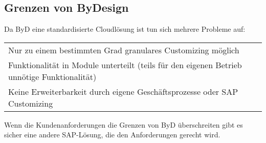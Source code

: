 \documentclass{handout}
\begin{document}
\subsection{Grenzen von ByDesign}

Da ByD eine standardisierte Cloudlösung ist tun sich mehrere Probleme auf:

\small
\begin{tabular}{L l}
Nur zu einem bestimmten Grad granulares Customizing möglich\\
Funktionalität in Module unterteilt (teils für den eigenen Betrieb unnötige Funktionalität)\\
Keine Erweiterbarkeit durch eigene Geschäftsprozesse oder SAP Customizing\\
\end{tabular}
\normalsize

Wenn die Kundenanforderungen die Grenzen von ByD überschreiten gibt es sicher eine andere SAP-Lösung, die den Anforderungen gerecht wird.


\newpage


\end{document}

